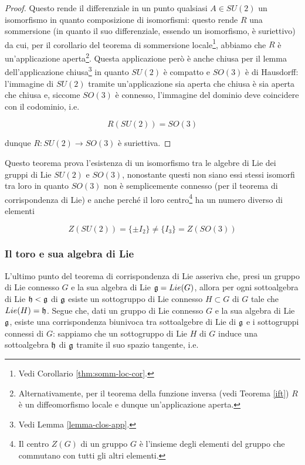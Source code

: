 \begin{proof}
	Questo rende il differenziale in un punto qualsiasi $ A \in SU(2) $ un isomorfismo in quanto composizione di isomorfismi: questo rende $ R $ una sommersione (in quanto il suo differenziale, essendo un isomorfismo, è suriettivo) da cui, per il corollario del teorema di sommersione locale\footnote{%
		Vedi Corollario \ref{thm:somm-loc-cor}.%
	}, abbiamo che $ R $ è un'applicazione aperta\footnote{%
		Alternativamente, per il teorema della funzione inversa (vedi Teorema \ref{ift}) $ R $ è un diffeomorfismo locale e dunque un'applicazione aperta.%
	}. Questa applicazione però è anche chiusa per il lemma dell'applicazione chiusa\footnote{%
		Vedi Lemma \ref{lemma-clos-app}.%
	} in quanto $ SU(2) $ è compatto e $ SO(3) $ è di Hausdorff: l'immagine di $ SU(2) $ tramite un'applicazione sia aperta che chiusa è sia aperta che chiusa e, siccome $ SO(3) $ è connesso, l'immagine del dominio deve coincidere con il codominio, i.e.

	\begin{equation}
		R(SU(2)) = SO(3)
	\end{equation}
	
	dunque $ R : SU(2) \to SO(3) $ è suriettiva.
\end{proof}

\begin{remark}
	Questo teorema prova l'esistenza di un isomorfismo tra le algebre di Lie dei gruppi di Lie $ SU(2) $ e $ SO(3) $, nonostante questi non siano essi stessi isomorfi tra loro in quanto $ SO(3) $ non è semplicemente connesso (per il teorema di corrispondenza di Lie) e anche perché il loro centro\footnote{%
		Il centro $ Z(G) $ di un gruppo $ G $ è l'insieme degli elementi del gruppo che commutano con tutti gli altri elementi.%
	} ha un numero diverso di elementi
	
	\begin{equation}
		Z(SU(2)) = \{ \pm I_{2} \} \neq \{ I_{3} \} = Z(SO(3))
	\end{equation}
\end{remark}

\subsubsection{Il toro e sua algebra di Lie}

L'ultimo punto del teorema di corrispondenza di Lie asseriva che, presi un gruppo di Lie  connesso $ G $ e la sua algebra di Lie $ \mathfrak{g} = Lie(G) $, allora per ogni sottoalgebra di Lie $ \mathfrak{h} < \mathfrak{g} $ di $ \mathfrak{g} $ esiste un sottogruppo di Lie connesso $ H \subset G $ di $ G $ tale che $ Lie(H) = \mathfrak{h} $. Segue che, dati un gruppo di Lie connesso $ G $ e la sua algebra di Lie $ \mathfrak{g} $, esiste una corrispondenza biunivoca tra sottoalgebre di Lie di $ \mathfrak{g} $ e i sottogruppi connessi di $ G $: sappiamo che un sottogruppo di Lie $ H $ di $ G $ induce una sottoalgebra $ \mathfrak{h} $ di $ \mathfrak{g} $ tramite il suo spazio tangente, i.e.

